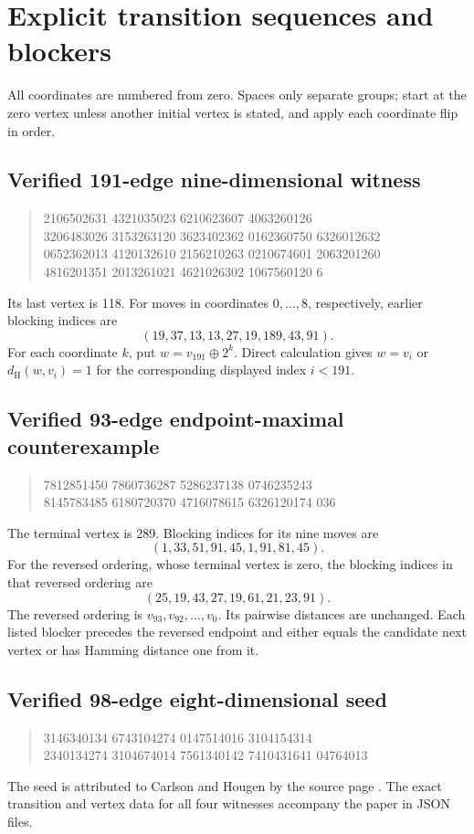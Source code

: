 \documentclass[11pt,a4paper]{article}
\theoremstyle{definition}
\theoremstyle{remark}
\newcommand{\Ham}{d_{\mathrm H}}
\begin{document}
\appendix
\section{Explicit transition sequences and blockers}\label{app:witness}
All coordinates are numbered from zero. Spaces only separate groups; start at the zero vertex unless another initial vertex is stated, and apply each coordinate flip in order.
\subsection{Verified 191-edge nine-dimensional witness}
\begin{quote}\small{} 2106502631 4321035023 6210623607 4063260126\\
3206483026 3153263120 3623402362 0162360750 6326012632\\
0652362013 4120132610 2156210263 0210674601 2063201260\\
4816201351 2013261021 4621026302 1067560120 6
\end{quote}
Its last vertex is 118. For moves in coordinates $0,\ldots,8$, respectively, earlier blocking indices are
\[
(19,37,13,13,27,19,189,43,91).
\]
For each coordinate $k$, put $w=v_{191}\mathbin{\oplus}2^k$. Direct calculation gives $w=v_i$ or $\Ham(w,v_i)=1$ for the corresponding displayed index $i<191$.

\subsection{Verified 93-edge endpoint-maximal counterexample}
\begin{quote}\small{} 7812851450 7860736287 5286237138 0746235243\\
8145783485 6180720370 4716078615 6326120174 036
\end{quote}
The terminal vertex is 289. Blocking indices for its nine moves are
\[
(1,33,51,91,45,1,91,81,45).
\]
For the reversed ordering, whose terminal vertex is zero, the blocking indices in that reversed ordering are
\[
(25,19,43,27,19,61,21,23,91).
\]
The reversed ordering is $v_{93},v_{92},\ldots,v_0$. Its pairwise distances are unchanged. Each listed blocker precedes the reversed endpoint and either equals the candidate next vertex or has Hamming distance one from it.

\subsection{Verified 98-edge eight-dimensional seed}
\begin{quote}\small{} 3146340134 6743104274 0147514016 3104154314\\
2340134274 3104674014 7561340142 7410431641 04764013
\end{quote}
The seed is attributed to Carlson and Hougen by the source page \cite{records}. The exact transition and vertex data for all four witnesses accompany the paper in JSON files.
\end{document}
